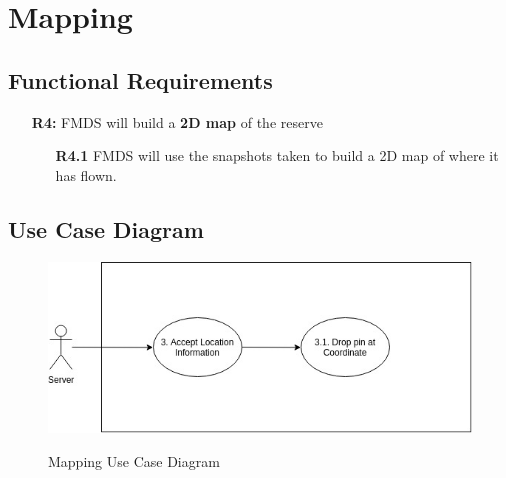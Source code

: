 \section{Mapping}

\subsection{Functional Requirements}

	\begin{flushleft}
		\begin{itemize}
			\item  [\textbf{R4:}] FMDS will build a \textbf{2D map} of the reserve

				\begin{itemize}
					\item  [\textbf{R4.1}] FMDS will use the snapshots taken to build a 2D map of where it has flown.
				\end{itemize}
		\end{itemize}
	\end{flushleft}

\subsection{Use Case Diagram}
	\begin{center}
		\begin{flushleft}
			\begin{figure}[h!]
				\centering
				\includegraphics[scale=0.45]{./assets/images/mapping-ucd.jpg}
				\label{fig: object-recognition-ucd }
				\caption{Mapping Use Case Diagram}
			\end{figure}

		\end{flushleft}
	\end{center}
